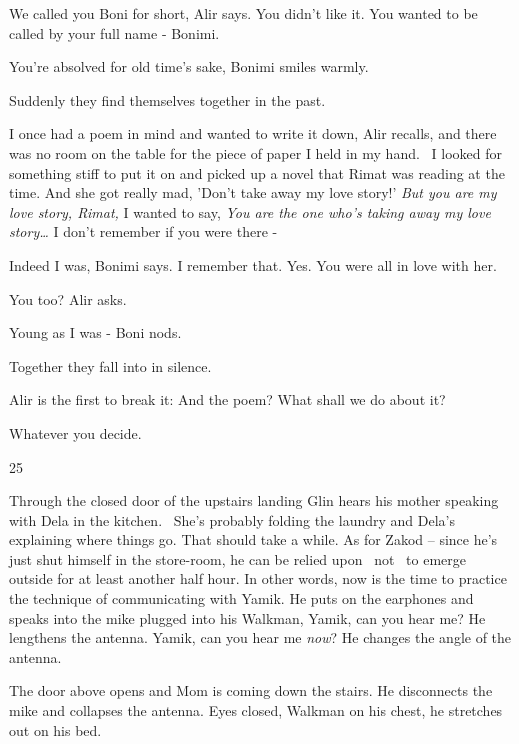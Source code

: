 \documentclass[12pt]{book}
\begin{document}
{\textquotedbl}We called you Boni for short,{\textquotedbl} Alir says. {\textquotedbl}You didn't like it. You wanted to
be called by your full name - Bonimi.{\textquotedbl}

{\textquotedbl}You're absolved for old time's sake,{\textquotedbl} Bonimi smiles warmly.

Suddenly they find themselves together in the past.

{\textquotedbl}I once had a poem in mind and wanted to write it down,{\textquotedbl} Alir recalls, {\textquotedbl}and
there was no room on the table for the piece of paper I held in my hand. ~I looked for something stiff to put it on and
picked up a novel that Rimat was reading at the time. And she got really mad, 'Don't take away my love story!'
\textit{But you are my love story, Rimat, }I wanted to say, \textit{You are the one who's taking away my love
story{\dots}} I don't remember if you were there -{\textquotedbl}

{\textquotedbl}Indeed I was,{\textquotedbl} Bonimi says. {\textquotedbl}I remember that. Yes. You were all in love with
her.{\textquotedbl}

{\textquotedbl}You too?{\textquotedbl} Alir asks.

{\textquotedbl}Young as I was -{\textquotedbl} Boni nods.

Together they fall into in silence.

Alir is the first to break it: {\textquotedbl}And the poem? What shall we do about it?{\textquotedbl}

{\textquotedbl}Whatever you decide.{\textquotedbl}


\bigskip

25~~

Through the closed door of the upstairs landing Glin hears his mother speaking with Dela in the kitchen. \ She's
probably folding the laundry and Dela's explaining where things go. That should take a while. As for Zakod -- since
he's just shut himself in the store-room, he can be relied upon \ not \ to emerge outside for at least another half
hour. In other words, now is the time to practice the technique of communicating with Yamik. He puts on the earphones
and speaks into the mike plugged into his Walkman, {\textquotedbl}Yamik, can you hear me?{\textquotedbl} He lengthens
the antenna. {\textquotedbl}Yamik, can you hear me \textit{now}?{\textquotedbl} He changes the angle of the antenna.

The door above opens and Mom is coming down the stairs. He disconnects the mike and collapses{ }the
antenna. Eyes closed, Walkman on his chest, he stretches out on his bed.
\end{document}
